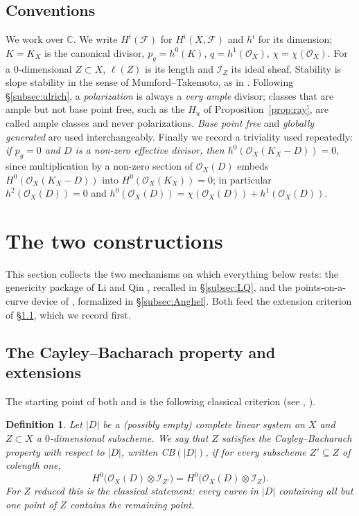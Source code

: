 \documentclass[10pt,a4paper]{amsart}
\newtheorem{definition}[theorem]{Definition}
\newcommand{\OO}{\mathcal{O}}
\newcommand{\FF}{\mathcal{F}}
\newcommand{\II}{\mathcal{I}}
\newcommand{\CC}{\mathbb{C}}
\newcommand{\len}{\ell}
\begin{document}
\subsection*{Conventions}
We work over $\CC$. We write $H^i(\FF)$ for $H^i(X,\FF)$ and $h^i$ for its dimension; $K=K_X$ is the canonical divisor, $p_g=h^0(K)$, $q=h^1(\OO_X)$, $\chi=\chi(\OO_X)$. For a $0$-dimensional $Z\subset X$, $\len(Z)$ is its length and $\II_Z$ its ideal sheaf. Stability is slope stability in the sense of Mumford--Takemoto, as in \cite{LQ94}. Following \S\ref{subsec:ulrich}, a \emph{polarization} is always a \emph{very ample} divisor; classes that are ample but not base point free, such as the $H_u$ of Proposition~\ref{prop:ray}, are called ample classes and never polarizations. \emph{Base point free} and \emph{globally generated} are used interchangeably. Finally we record a triviality used repeatedly: \emph{if $p_g=0$ and $D$ is a non-zero effective divisor, then $h^0(\OO_X(K_X-D))=0$}, since multiplication by a non-zero section of $\OO_X(D)$ embeds $H^0(\OO_X(K_X-D))$ into $H^0(\OO_X(K_X))=0$; in particular $h^2(\OO_X(D))=0$ and $h^0(\OO_X(D))=\chi(\OO_X(D))+h^1(\OO_X(D))$.

\section{The two constructions}\label{sec:methods}

This section collects the two mechanisms on which everything below rests: the genericity package of Li and Qin \cite{LQ94}, recalled in \S\ref{subsec:LQ}, and the points-on-a-curve device of \cite{An94}, formalized in \S\ref{subsec:Anghel}. Both feed the extension criterion of \S\ref{subsec:CB}, which we record first.

\subsection{The Cayley--Bacharach property and extensions}\label{subsec:CB}
The starting point of both \cite{LQ94} and \cite{An94} is the following classical criterion (see \cite[p.~731]{GH78book}, \cite[Prop.~2.2]{LQ94}).

\begin{definition}\label{def:CB}
Let $|D|$ be a (possibly empty) complete linear system on $X$ and $Z\subset X$ a $0$-dimensional subscheme. We say that $Z$ satisfies the \emph{Cayley--Bacharach property with respect to $|D|$}, written CB$(|D|)$, if for every subscheme $Z'\subseteq Z$ of colength one,
\[
H^0\bigl(\OO_X(D)\otimes\II_{Z'}\bigr)=H^0\bigl(\OO_X(D)\otimes\II_{Z}\bigr).
\]
For $Z$ reduced this is the classical statement: every curve in $|D|$ containing all but one point of $Z$ contains the remaining point.
\end{definition}
\end{document}
